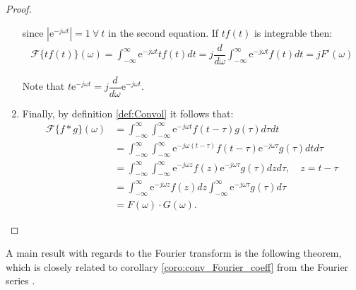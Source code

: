 \begin{proof}
\begin{enumerate}[label=(\alph*)]
since $|\text{e}^{-j\omega t}| = 1 \ \forall \ t$ in the second equation. If $tf(t)$ is integrable then:
\begin{align*}
\mathcal{F}\{tf(t)\}(\omega) = \int_{-\infty}^\infty \text{e}^{-j \omega t} t f(t) dt = j \dfrac{d}{d\omega} \int_{-\infty}^\infty \text{e}^{-j \omega t} f(t) dt = j F'(\omega)
\end{align*}

Note that $t \text{e}^{-j \omega t} = j \dfrac{d}{d\omega} \text{e}^{-j\omega t}$.

\item Finally, by definition \ref{def:Convol} it follows that:
\begin{align*}
\mathcal{F}\{f*g\}(\omega) &= \int_{-\infty}^\infty \int_{-\infty}^\infty \text{e}^{-j \omega t} f(t - \tau) g(\tau) d\tau dt \\
&= \int_{-\infty}^\infty \int_{-\infty}^\infty \text{e}^{-j\omega(t-\tau)} f(t-\tau) \text{e}^{-j\omega \tau} g(\tau) dt d\tau \\
&= \int_{-\infty}^\infty \int_{-\infty}^\infty \text{e}^{-j\omega z} f(z) \text{e}^{-j\omega \tau} g(\tau) dz d\tau, \quad z = t - \tau \\
&= \int_{-\infty}^\infty \text{e}^{-j\omega z} f(z) dz \int_{-\infty}^\infty \text{e}^{-j\omega \tau} g(\tau) d\tau \\
&= F(\omega) \cdot G(\omega).
\end{align*}
\end{enumerate}
\end{proof}

A main result with regards to the Fourier transform is the following theorem, which is closely related to corollary \ref{coro:conv_Fourier_coeff} from the Fourier series \cite{page 217, FAA}.

